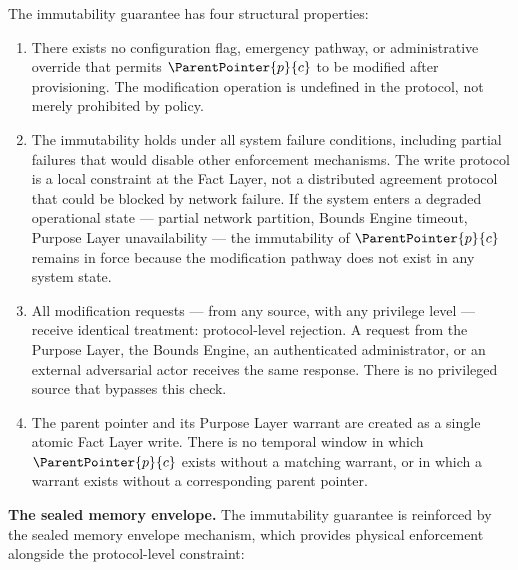 The immutability guarantee has four structural properties:

\begin{enumerate}
    \item[(I1) \textbf{No override path for any actor}] There exists no configuration flag, emergency pathway, or administrative override that permits $\ParentPointer{p}{c}$ to be modified after provisioning. The modification operation is undefined in the protocol, not merely prohibited by policy.

    \item[(I2) \textbf{Failure-state resilience}] The immutability holds under all system failure conditions, including partial failures that would disable other enforcement mechanisms. The write protocol is a local constraint at the Fact Layer, not a distributed agreement protocol that could be blocked by network failure. If the system enters a degraded operational state — partial network partition, Bounds Engine timeout, Purpose Layer unavailability — the immutability of $\ParentPointer{p}{c}$ remains in force because the modification pathway does not exist in any system state.

    \item[(I3) \textbf{Source-equivalence of enforcement}] All modification requests — from any source, with any privilege level — receive identical treatment: protocol-level rejection. A request from the Purpose Layer, the Bounds Engine, an authenticated administrator, or an external adversarial actor receives the same response. There is no privileged source that bypasses this check.

    \item[(I4) \textbf{Atomic warrant-pointer creation}] The parent pointer and its Purpose Layer warrant are created as a single atomic Fact Layer write. There is no temporal window in which $\ParentPointer{p}{c}$ exists without a matching warrant, or in which a warrant exists without a corresponding parent pointer.
\end{enumerate}

\medskip
\noindent\textbf{The sealed memory envelope.} The immutability guarantee is reinforced by the sealed memory envelope mechanism, which provides physical enforcement alongside the protocol-level constraint:

